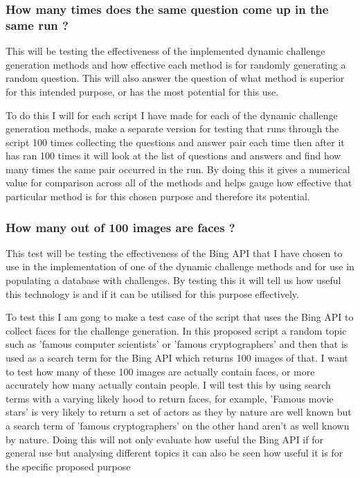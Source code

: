 \documentclass[12pt,a4paper]{article}
\begin{document}
\subsubsection{How many times does the same question come up in the same run ?} This will be testing the effectiveness of the implemented dynamic challenge generation methods and how effective each method is for randomly generating a random question. This will also answer the question of what method is superior for this intended purpose, or has the most potential for this use.  

To do this I will for each script I have made for each of the dynamic challenge generation methods, make a separate version for testing that runs through the script 100 times collecting the questions and answer pair each time then after it has ran 100 times it will look at the list of questions and answers and find how many times the same pair occurred in the run. By doing this it gives a numerical value for comparison across all of the methods and helps gauge how effective that particular method is for this chosen purpose and therefore its potential. 
\subsubsection{How many out of 100 images are faces ?}  
This test will be testing the effectiveness of the Bing API that I have chosen to use in the implementation of one of the dynamic challenge methods and for use in populating a database with challenges. By testing this it will tell us how useful this technology is and if it can be utilised for this purpose effectively. 

To test this I am gong to make a test case of the script that uses the Bing API to collect faces for the challenge generation. In this proposed script a random topic such as 'famous computer scientists' or 'famous cryptographers' and then that is used as a search term for the Bing API which returns 100 images of that. I want to test how many of these 100 images are actually contain faces, or more accurately how many actually contain people. I will test this by using search terms with a varying likely hood to return faces, for example,  'Famous movie stars' is very likely to return a set of actors as they by nature are well known but a search term of 'famous cryptographers' on the other hand aren't as well known by nature. Doing this will not only evaluate how useful the Bing API if for general use but analysing different topics it can also be seen how useful it is for the specific  proposed purpose 
\end{document}
